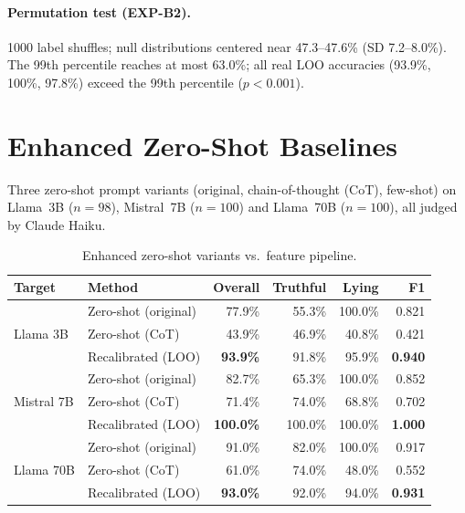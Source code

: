 \paragraph{Permutation test (EXP-B2).}
1000 label shuffles; null distributions centered near 47.3--47.6\% (SD 7.2--8.0\%). The 99th percentile reaches at most 63.0\%; all real LOO accuracies (93.9\%, 100\%, 97.8\%) exceed the 99th percentile ($p<0.001$).

\section{Enhanced Zero-Shot Baselines}
\label{app:zero_shot}
\label{sec:zero_shot}

Three zero-shot prompt variants (original, chain-of-thought (CoT), few-shot) on Llama~3B ($n=98$), Mistral~7B ($n=100$) and Llama~70B ($n=100$), all judged by Claude Haiku.

\begin{table}[h]
\centering
\caption{Enhanced zero-shot variants vs.\ feature pipeline.}
\label{tab:zero_shot_comparison}
\begin{tabular}{llrrrr}
\toprule
\textbf{Target} & \textbf{Method} & \textbf{Overall} & \textbf{Truthful} & \textbf{Lying} & \textbf{F1} \\
\midrule
\multirow{3}{*}{Llama 3B}
  & Zero-shot (original)  & 77.9\% & 55.3\% & 100.0\% & 0.821 \\
  & Zero-shot (CoT)       & 43.9\% & 46.9\% & 40.8\%  & 0.421 \\
  & Recalibrated (LOO)    & \textbf{93.9\%} & 91.8\% & 95.9\%  & \textbf{0.940} \\
\midrule
\multirow{3}{*}{Mistral 7B}
  & Zero-shot (original)  & 82.7\% & 65.3\% & 100.0\% & 0.852 \\
  & Zero-shot (CoT)       & 71.4\% & 74.0\% & 68.8\%  & 0.702 \\
  & Recalibrated (LOO)    & \textbf{100.0\%} & 100.0\% & 100.0\% & \textbf{1.000} \\
\midrule
\multirow{3}{*}{Llama 70B}
  & Zero-shot (original)  & 91.0\% & 82.0\% & 100.0\% & 0.917 \\
  & Zero-shot (CoT)       & 61.0\% & 74.0\% & 48.0\%  & 0.552 \\
  & Recalibrated (LOO)    & \textbf{93.0\%} & 92.0\% & 94.0\%  & \textbf{0.931} \\
\bottomrule
\end{tabular}
\end{table}

